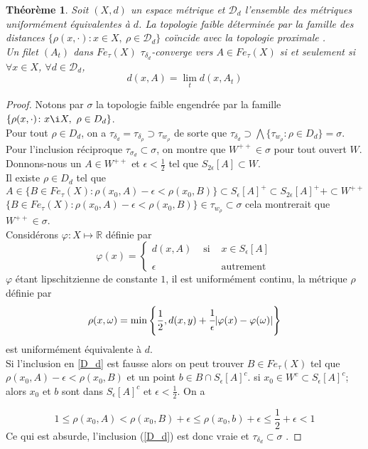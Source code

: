 \documentclass[11pt]{report}
\newenvironment{boxtheorem}
{\begin{tcolorbox}
		[enhanced jigsaw,breakable,pad at break*=2mm,
		colback=black!5,colframe=bleueLeger]}
	{\end{tcolorbox}}
\theoremstyle{styletheorem}
\newtheorem{theoreme}{Théorème}[section]
\newenvironment{theorem}
{\vspace*{0.3cm}\begin{boxtheorem}\begin{theoreme}}{\end{theoreme}\end{boxtheorem}\vspace*{0.3cm}}
\theoremstyle{styledef}
\theoremstyle{remark}
\newcommand{\ssi}{si et seulement si\  }
\newcommand{\R}{\ensuremath{\mathbb{R}}}
\newcommand{\Fe}{\ensuremath{Fe_{\tau}(X)}}
\begin{document}
\begin{theorem}\label{th122}
	Soit $(X,d)$ un espace métrique et $\mathcal{D}_d$ l'ensemble des métriques uniformément équivalentes à $d$. La topologie faible déterminée par la famille des distances $\lbrace \rho(x,\cdot) \colon x \in X, \ \rho \in \mathcal{D}_d \rbrace$ coïncide avec la topologie proximale \cite{b8}.\\
	Un filet $(A_t)$ dans $\Fe$ $\tau_{\delta_d}$-converge vers $A \in \Fe$ \ssi $\forall x \in X$, $\forall d \in \mathcal{D}_d$, $$d(x,A) = \lim_t d(x,A_t)$$
\end{theorem}
\begin{proof}
	Notons par $\sigma$ la topologie faible engendrée par  la famille $\lbrace \rho(x,\cdot) \colon x \i  X,\ \rho \in D_d\rbrace$.\\
	Pour tout $\rho \in D_d$, on a $\tau_{\delta_d} = \tau_{\delta_\rho} \supset \tau_{w_\rho}$ de sorte que $\tau_{\delta_d} \supset \bigwedge \lbrace \tau_{w_\rho} \colon \rho \in D_d \rbrace = \sigma$.\\
	Pour l'inclusion réciproque $\tau_{\sigma_d} \subset \sigma$, on montre que $W^{++} \in \sigma$ pour tout ouvert $W$. Donnons-nous un $A \in W^{++}$ et $\epsilon <\frac{1}{2}$ tel que $S_{2\epsilon} [A] \subset W$.\\
	Il existe $\rho  \in D_d$ tel que 
	\begin{equation}\label{D_d}
		A \in \lbrace B \in \Fe \colon \rho(x_0,A)-\epsilon < \rho(x_0,B)\rbrace \subset S_\epsilon [A]^+ \subset S_{2\epsilon}[A]^++ \subset W^{++}
	\end{equation}
	$\lbrace B \in \Fe \colon \rho(x_0,A) -\epsilon < \rho(x_0,B)\rbrace \in \tau_{w_\rho} \subset \sigma$ cela montrerait que $W^{++} \in \sigma$.\\
	Considérons $\varphi \colon X \mapsto \R$ définie par 
	$$\varphi(x) = \left \lbrace \begin{array}{ccl}
		d(x,A) & \text{ si } & x \in S_\epsilon [A]\\ \\
		\epsilon &  & \text{autrement}
	\end{array}\right.$$
	$\varphi$ étant lipschitzienne de constante $1$, il est uniformément continu, la métrique  $\rho$ définie par $$\rho (x,\omega) = \min \left\lbrace \frac{1}{2}, d(x,y) + \cfrac{1}{\epsilon} \lvert \varphi(x) - \varphi(\omega)\rvert \right\rbrace$$ est uniformément équivalente à $d$.\\
	Si l'inclusion en \ref{D_d} est fausse alors on peut trouver $B  \in \Fe$ tel que $\rho (x_0,A)-\epsilon < \rho(x_0,B) $ et un point $b \in B \cap S_\epsilon [A]^c$. si $x_0 \in W^c \subset S_\epsilon [A]^c$; alors $x_0$ et $b$ sont dans $S_\epsilon [A]^c $ et $\epsilon <\frac{1}{2}$. On a  
	
	
	$$1 \leq \rho(x_0,A) < \rho (x_0,B) + \epsilon \leq \rho (x_0,b) +  \epsilon \leq \frac{1}{2} + \epsilon < 1$$
	Ce qui est absurde, l'inclusion (\ref{D_d}) est donc vraie et $\tau_{\delta_d} \subset \sigma$ .
\end{proof}\ \\
\end{document}
